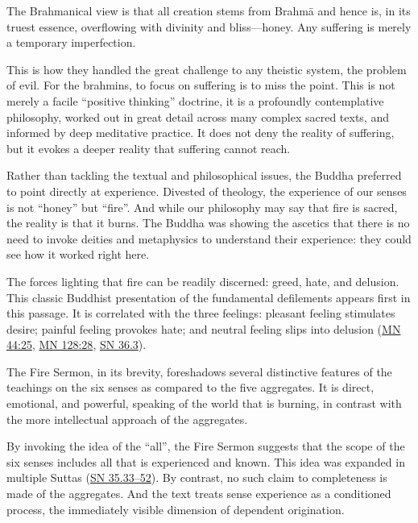 \documentclass[12pt,openany]{book}%
\begin{document}
The Brahmanical view is that all creation stems from \textsanskrit{Brahmā} and hence is, in its truest essence, overflowing with divinity and bliss—honey. Any suffering is merely a temporary imperfection.

This is how they handled the great challenge to any theistic system, the problem of evil. For the brahmins, to focus on suffering is to miss the point. This is not merely a facile “positive thinking” doctrine, it is a profoundly contemplative philosophy, worked out in great detail across many complex sacred texts, and informed by deep meditative practice. It does not deny the reality of suffering, but it evokes a deeper reality that suffering cannot reach.

Rather than tackling the textual and philosophical issues, the Buddha preferred to point directly at experience. Divested of theology, the experience of our senses is not “honey” but “fire”. And while our philosophy may say that fire is sacred, the reality is that it burns. The Buddha was showing the ascetics that there is no need to invoke deities and metaphysics to understand their experience: they could see how it worked right here.

The forces lighting that fire can be readily discerned: greed, hate, and delusion. This classic Buddhist presentation of the fundamental defilements appears first in this passage. It is correlated with the three feelings: pleasant feeling stimulates desire; painful feeling provokes hate; and neutral feeling slips into delusion (\href{https://suttacentral.net/mn44/en/sujato\#25}{MN 44:25}, \href{https://suttacentral.net/mn128/en/sujato\#28}{MN 128:28}, \href{https://suttacentral.net/sn36.3}{SN 36.3}).

The Fire Sermon, in its brevity, foreshadows several distinctive features of the teachings on the six senses as compared to the five aggregates. It is direct, emotional, and powerful, speaking of the world that is burning, in contrast with the more intellectual approach of the aggregates.

By invoking the idea of the “all”, the Fire Sermon suggests that the scope of the six senses includes all that is experienced and known. This idea was expanded in multiple Suttas (\href{https://suttacentral.net/sn35.33}{SN 35.33–52}). By contrast, no such claim to completeness is made of the aggregates. And the text treats sense experience as a conditioned process, the immediately visible dimension of dependent origination.
\end{document}
